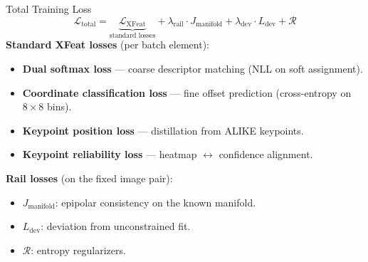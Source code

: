 \documentclass[aspectratio=169, 12pt]{beamer}
\begin{document}
\begin{frame}{Total Training Loss}
\small
\vspace{-0.3em}
\[
    \boxed{
    \mathcal{L}_{\mathrm{total}} =
        \underbrace{\mathcal{L}_{\mathrm{XFeat}}}_{\text{standard losses}}
      + \lambda_{\mathrm{rail}} \cdot J_{\mathrm{manifold}}
      + \lambda_{\mathrm{dev}} \cdot L_{\mathrm{dev}}
      + \mathcal{R}
    }
\]
\vspace{-0.3em}
\textbf{Standard XFeat losses} (per batch element):
\begin{itemize}\setlength{\itemsep}{1pt}
    \item \textbf{Dual softmax loss} --- coarse descriptor matching (NLL on soft assignment).
    \item \textbf{Coordinate classification loss} --- fine offset prediction (cross-entropy on $8\times 8$ bins).
    \item \textbf{Keypoint position loss} --- distillation from ALIKE keypoints.
    \item \textbf{Keypoint reliability loss} --- heatmap $\leftrightarrow$ confidence alignment.
\end{itemize}

\textbf{Rail losses} (on the fixed image pair):
\begin{itemize}\setlength{\itemsep}{1pt}
    \item $J_{\mathrm{manifold}}$: epipolar consistency on the known manifold.
    \item $L_{\mathrm{dev}}$: deviation from unconstrained fit.
    \item $\mathcal{R}$: entropy regularizers.
\end{itemize}
\end{frame}
\end{document}
